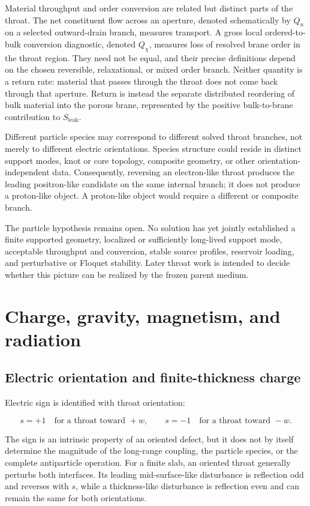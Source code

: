 Material throughput and order conversion are related but distinct parts of the
throat. The net constituent flow across an aperture, denoted schematically by
\(Q_n\) on a selected outward-drain branch, measures transport. A gross local
ordered-to-bulk conversion diagnostic, denoted \(Q_\chi\), measures loss of
resolved brane order in the throat region. They need not be equal, and their
precise definitions depend on the chosen reversible, relaxational, or mixed
order branch. Neither quantity is a return rate: material that passes through
the throat does not come back through that aperture. Return is instead the
separate distributed reordering of bulk material into the porous brane,
represented by the positive bulk-to-brane contribution to
\(S_{\mathrm{leak}}\).

Different particle species may correspond to different solved throat branches,
not merely to different electric orientations. Species structure could reside
in distinct support modes, knot or core topology, composite geometry, or other
orientation-independent data. Consequently, reversing an electron-like throat
produces the leading positron-like candidate on the same internal branch; it
does not produce a proton-like object. A proton-like object would require a
different or composite branch.

The particle hypothesis remains open. No solution has yet jointly established a
finite supported geometry, localized or sufficiently long-lived support mode,
acceptable throughput and conversion, stable source profiles, reservoir loading,
and perturbative or Floquet stability. Later throat work is intended to decide
whether this picture can be realized by the frozen parent medium.

\section{Charge, gravity, magnetism, and radiation}

\subsection{Electric orientation and finite-thickness charge}

Electric sign is identified with throat orientation:

\[
s=+1\quad\text{for a throat toward }+w,
\qquad
s=-1\quad\text{for a throat toward }-w.
\]

The sign is an intrinsic property of an oriented defect, but it does not by
itself determine the magnitude of the long-range coupling, the particle species,
or the complete antiparticle operation. For a finite slab, an oriented throat
generally perturbs both interfaces. Its leading mid-surface-like disturbance is
reflection odd and reverses with \(s\), while a thickness-like disturbance is
reflection even and can remain the same for both orientations.

